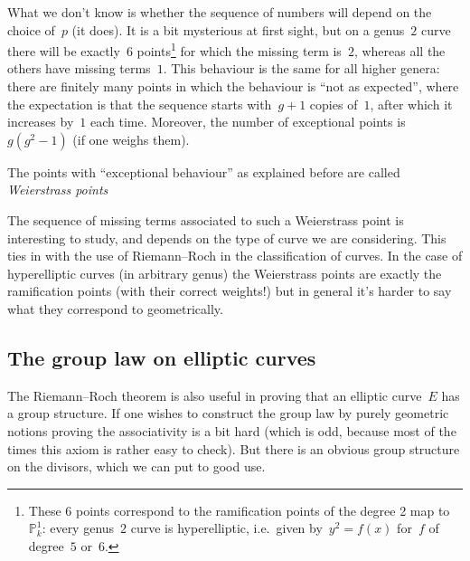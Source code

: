 What we don't know is whether the sequence of numbers will depend on the choice of~$p$ (it does). It is a bit mysterious at first sight, but on a genus~$2$ curve there will be exactly~$6$ points\footnote{These 6 points correspond to the ramification points of the degree 2 map to~$\mathbb{P}_k^1$: every genus~$2$ curve is hyperelliptic, i.e.\ given by~$y^2=f(x)$ for~$f$ of degree~$5$ or~$6$.} for which the missing term is~$2$, whereas all the others have missing terms~$1$. This behaviour is the same for all higher genera: there are finitely many points in which the behaviour is ``not as expected'', where the expectation is that the sequence starts with~$g+1$ copies of~$1$, after which it increases by~$1$ each time. Moreover, the number of exceptional points is~$g(g^2-1)$ (if one weighs them).

\begin{definition}
  The points with ``exceptional behaviour'' as explained before are called \emph{Weierstrass points}
\end{definition}

The sequence of missing terms associated to such a Weierstrass point is interesting to study, and depends on the type of curve we are considering. This ties in with the use of Riemann--Roch in the classification of curves. In the case of hyperelliptic curves (in arbitrary genus) the Weierstrass points are exactly the ramification points (with their correct weights!) but in general it's harder to say what they correspond to geometrically.

\subsection{The group law on elliptic curves}
The Riemann--Roch theorem is also useful in proving that an elliptic curve~$E$ has a group structure. If one wishes to construct the group law by purely geometric notions proving the associativity is a bit hard (which is odd, because most of the times this axiom is rather easy to check). But there is an obvious group structure on the divisors, which we can put to good use.

